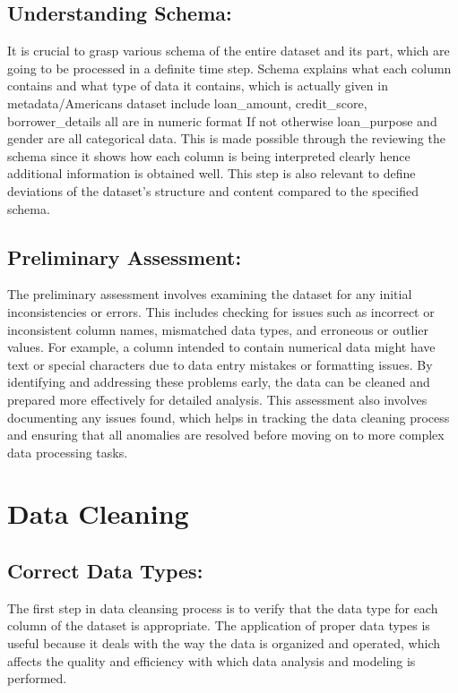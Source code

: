 \documentclass[12pt, a4paper,oneside]{book}
\numberwithin{equation}{section}
\begin{document}
\subsection{Understanding Schema:} 

It is crucial to grasp various schema of the entire dataset and its part, which are going to be processed in a definite time step. Schema explains what each column contains and what type of data it contains, which is actually given in metadata/Americans dataset include loan\_amount, credit\_score, borrower\_details all are in numeric format If not otherwise loan\_purpose and gender are all categorical data. This is made possible through the reviewing the schema since it shows how each column is being interpreted clearly hence additional information is obtained well. This step is also relevant to define deviations of the dataset’s structure and content compared to the specified schema. 

\subsection{Preliminary Assessment:} 

The preliminary assessment involves examining the dataset for any initial inconsistencies or errors. This includes checking for issues such as incorrect or inconsistent column names, mismatched data types, and erroneous or outlier values. For example, a column intended to contain numerical data might have text or special characters due to data entry mistakes or formatting issues. By identifying and addressing these problems early, the data can be cleaned and prepared more effectively for detailed analysis. This assessment also involves documenting any issues found, which helps in tracking the data cleaning process and ensuring that all anomalies are resolved before moving on to more complex data processing tasks.

\section{ Data Cleaning}

\subsection{Correct Data Types:} 

The first step in data cleansing process is to verify that the data type for each column of the dataset is appropriate. The application of proper data types is useful because it deals with the way the data is organized and operated, which affects the quality and efficiency with which data analysis and modeling is performed.
\end{document}
